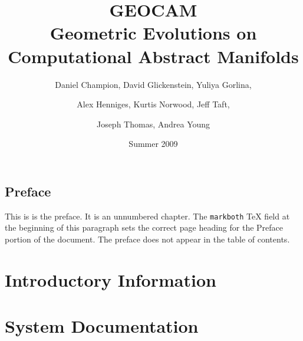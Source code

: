 \documentclass{book}
\begin{document}
\frontmatter
\title{GEOCAM\\
Geometric Evolutions on Computational Abstract Manifolds}
\author{Daniel Champion, David Glickenstein, Yuliya Gorlina, \and Alex
Henniges, Kurtis Norwood, Jeff Taft, \and Joseph Thomas, Andrea Young}
\date{Summer 2009}
\maketitle
\tableofcontents

\chapter*{Preface}

This is is the preface. It is an unnumbered
chapter. The \verb|markboth| TeX field at the beginning of this paragraph
sets the correct page heading for the Preface portion of the document. The
preface does not appear in the table of contents.

\mainmatter

\part{Introductory Information}

%

%

\part{System Documentation}

%

%

%

%

%
\end{document}
